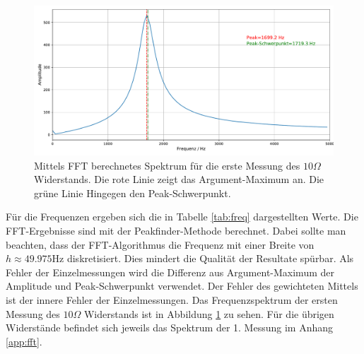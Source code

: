 \documentclass[a4paper, 12pt]{scrartcl}
\begin{document}
\begin{figure}[h]
\centering
\includegraphics[width=\textwidth]{plots/fft/fft_schwingung3_1.pdf}
\caption{Mittels FFT berechnetes Spektrum für die erste Messung des $10\Omega$ Widerstands. Die rote Linie zeigt das Argument-Maximum an. Die grüne Linie Hingegen den Peak-Schwerpunkt.}
\label{abb:fft1}
\end{figure}

Für die Frequenzen ergeben sich die in Tabelle \ref{tab:freq} dargestellten Werte. Die FFT-Ergebnisse sind mit der Peakfinder-Methode berechnet. Dabei sollte man beachten, dass der FFT-Algorithmus die Frequenz mit einer Breite von $h\approx 49.975 \text{Hz}$ diskretisiert. Dies mindert die Qualität der Resultate spürbar. Als Fehler der Einzelmessungen wird die Differenz aus Argument-Maximum der Amplitude und Peak-Schwerpunkt verwendet. Der Fehler des gewichteten Mittels ist der innere Fehler der Einzelmessungen. Das Frequenzspektrum der ersten Messung des $10\Omega$ Widerstands ist in Abbildung \ref{abb:fft1} zu sehen. Für die übrigen Widerstände befindet sich jeweils das Spektrum der 1. Messung im Anhang \ref{app:fft}.
\end{document}
